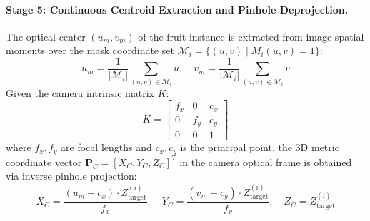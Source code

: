 \documentclass[12pt,a4paper]{article}
\begin{document}
\paragraph{Stage 5: Continuous Centroid Extraction and Pinhole Deprojection.}
The optical center $(u_m, v_m)$ of the fruit instance is extracted from image spatial moments over the mask coordinate set $\mathcal{M}_i = \{(u, v) \mid M_i(u, v) = 1\}$:
\begin{equation}
u_m = \frac{1}{|\mathcal{M}_i|} \sum_{(u, v) \in \mathcal{M}_i} u, \quad v_m = \frac{1}{|\mathcal{M}_i|} \sum_{(u, v) \in \mathcal{M}_i} v
\end{equation}
Given the camera intrinsic matrix $K$:
\begin{equation}
K = \begin{bmatrix} f_x & 0 & c_x \\ 0 & f_y & c_y \\ 0 & 0 & 1 \end{bmatrix}
\end{equation}
where $f_x, f_y$ are focal lengths and $c_x, c_y$ is the principal point, the 3D metric coordinate vector $\mathbf{P}_C = [X_C, Y_C, Z_C]^T$ in the camera optical frame is obtained via inverse pinhole projection:
\begin{equation}
X_C = \frac{(u_m - c_x) \cdot Z_{\text{target}}^{(i)}}{f_x}, \quad Y_C = \frac{(v_m - c_y) \cdot Z_{\text{target}}^{(i)}}{f_y}, \quad Z_C = Z_{\text{target}}^{(i)}
\label{eq:pinhole_deprojection}
\end{equation}
\end{document}
